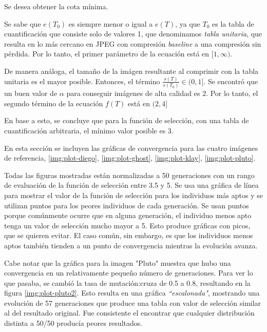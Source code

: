 Se desea obtener la cota mínima.

Se sabe que $e(T_0)$ es siempre menor o igual a $e(T)$, ya que $T_0$ es la
tabla de cuantificación que consiste solo de valores 1, que denominamos
\emph{tabla unitaria}, que resulta en lo más cercano en JPEG con compresión
\emph{baseline} a una compresión sin pérdida. Por lo tanto, el primer parámetro
de la ecuación está en $[1, \infty)$.

De manera análoga, el tamaño de la imágen resultante al comprimir con la tabla
unitaria es el mayor posible. Entonces, el término $\frac{s(T)}{s(T_0)} \in (0,
1]$. Se encontró que un buen valor de $\alpha$ para conseguir imágenes de alta
calidad es 2. Por lo tanto, el segundo término de la ecuación $f(T)$ está en
$(2, 4]$

En base a esto, se concluye que para la función de selección, con una tabla de
cuantificación arbitraria, el mínimo valor posible es 3.

En esta sección se incluyen las gráficas de convergencia para las cuatro
imágenes de referencia, \ref{img:plot-diego}, \ref{img:plot-ghost},
\ref{img:plot-klay}, \ref{img:plot-pluto}.

Todas las figuras mostradas están normalizadas a 50 generaciones con un rango
de evaluación de la función de selección entre 3.5 y 5. Se usa una gráfica de
línea para mostrar el valor de la función de selección para los individuos más
aptos y se utilizan puntos para los peores individuos de cada generación. Se
usan puntos porque comúnmente ocurre que en alguna generación, el individuo
menos apto tenga un valor de selección mucho mayor a 5. Esto produce gráficas
con picos, que se quieren evitar. El caso común, sin embargo, es que los
individuos menos aptos también tienden a un punto de convergencia mientras la
evolución avanza.

Cabe notar que la gráfica para la imagen "Pluto" muestra que hubo una
convergencia en un relativamente pequeño número de generaciones. Para ver lo
que pasaba, se cambió la tasa de mutación:cruza de 0.5 a 0.8, resultando en la
figura \ref{img:plot-pluto2}. Esto resulta en una gráfica
\emph{``escalonada"}, mostrando una evolución de 57 generaciones que produce una
tabla con valor de selección similar al del resultado original. Fue consistente
el encontrar que cualquier distribución distinta a 50/50 producía peores
resultados.

